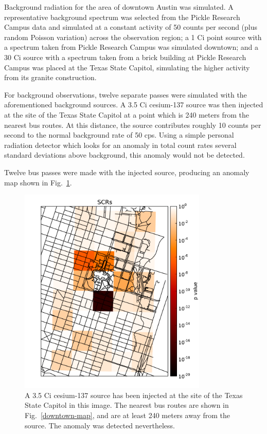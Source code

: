Background radiation for the area of downtown Austin was simulated. A
representative background spectrum was selected from the Pickle Research Campus
data and simulated at a constant activity of 50 counts per second (plus random
Poisson variation) across the observation region; a 1 Ci point source with a
spectrum taken from Pickle Research Campus was simulated downtown; and a 30 Ci
source with a spectrum taken from a brick building at Pickle Research Campus was
placed at the Texas State Capitol, simulating the higher activity from its
granite construction.

For background observations, twelve separate passes were simulated with the
aforementioned background sources. A 3.5 Ci cesium-137 source was then injected
at the site of the Texas State Capitol at a point which is 240 meters from the
nearest bus routes. At this distance, the source contributes roughly 10 counts
per second to the normal background rate of 50 cps. Using a simple personal
radiation detector which looks for an anomaly in total count rates several
standard deviations above background, this anomaly would not be detected.

Twelve bus passes were made with the injected source, producing an anomaly map
shown in Fig.~\ref{downtown-scrs}.

\begin{figure}
  \centering
  \includegraphics[width=0.8\textwidth]{figures/downtown-injected-scrs.pdf}
  \caption{A 3.5 Ci cesium-137 source has been injected at the site of the Texas
    State Capitol in this image. The nearest bus routes are shown in
    Fig.~\ref{downtown-map}, and are at least 240 meters away from the
    source. The anomaly was detected nevertheless.}
  \label{downtown-scrs}
\end{figure}

